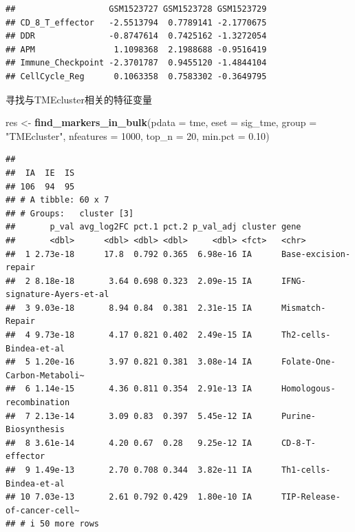 \documentclass[
  12pt,
]{book}
\newenvironment{Shaded}{\begin{snugshade}}{\end{snugshade}}
\newcommand{\AttributeTok}[1]{\textcolor[rgb]{0.13,0.29,0.53}{#1}}
\newcommand{\DecValTok}[1]{\textcolor[rgb]{0.00,0.00,0.81}{#1}}
\newcommand{\FloatTok}[1]{\textcolor[rgb]{0.00,0.00,0.81}{#1}}
\newcommand{\FunctionTok}[1]{\textcolor[rgb]{0.13,0.29,0.53}{\textbf{#1}}}
\newcommand{\NormalTok}[1]{#1}
\newcommand{\OtherTok}[1]{\textcolor[rgb]{0.56,0.35,0.01}{#1}}
\newcommand{\StringTok}[1]{\textcolor[rgb]{0.31,0.60,0.02}{#1}}
\theoremstyle{definition}
\theoremstyle{definition}
\theoremstyle{definition}
\theoremstyle{definition}
\theoremstyle{remark}
\begin{document}
\begin{verbatim}
##                   GSM1523727 GSM1523728 GSM1523729
## CD_8_T_effector   -2.5513794  0.7789141 -2.1770675
## DDR               -0.8747614  0.7425162 -1.3272054
## APM                1.1098368  2.1988688 -0.9516419
## Immune_Checkpoint -2.3701787  0.9455120 -1.4844104
## CellCycle_Reg      0.1063358  0.7583302 -0.3649795
\end{verbatim}

寻找与TMEcluster相关的特征变量

\begin{Shaded}
\begin{Highlighting}[]
\NormalTok{res }\OtherTok{\textless{}{-}} \FunctionTok{find\_markers\_in\_bulk}\NormalTok{(}\AttributeTok{pdata =}\NormalTok{ tme, }\AttributeTok{eset =}\NormalTok{ sig\_tme, }\AttributeTok{group =} \StringTok{"TMEcluster"}\NormalTok{, }\AttributeTok{nfeatures =} \DecValTok{1000}\NormalTok{, }\AttributeTok{top\_n =} \DecValTok{20}\NormalTok{, }\AttributeTok{min.pct =} \FloatTok{0.10}\NormalTok{)}
\end{Highlighting}
\end{Shaded}

\begin{verbatim}
## 
##  IA  IE  IS 
## 106  94  95 
## # A tibble: 60 x 7
## # Groups:   cluster [3]
##       p_val avg_log2FC pct.1 pct.2 p_val_adj cluster gene                       
##       <dbl>      <dbl> <dbl> <dbl>     <dbl> <fct>   <chr>                      
##  1 2.73e-18      17.8  0.792 0.365  6.98e-16 IA      Base-excision-repair       
##  2 8.18e-18       3.64 0.698 0.323  2.09e-15 IA      IFNG-signature-Ayers-et-al 
##  3 9.03e-18       8.94 0.84  0.381  2.31e-15 IA      Mismatch-Repair            
##  4 9.73e-18       4.17 0.821 0.402  2.49e-15 IA      Th2-cells-Bindea-et-al     
##  5 1.20e-16       3.97 0.821 0.381  3.08e-14 IA      Folate-One-Carbon-Metaboli~
##  6 1.14e-15       4.36 0.811 0.354  2.91e-13 IA      Homologous-recombination   
##  7 2.13e-14       3.09 0.83  0.397  5.45e-12 IA      Purine-Biosynthesis        
##  8 3.61e-14       4.20 0.67  0.28   9.25e-12 IA      CD-8-T-effector            
##  9 1.49e-13       2.70 0.708 0.344  3.82e-11 IA      Th1-cells-Bindea-et-al     
## 10 7.03e-13       2.61 0.792 0.429  1.80e-10 IA      TIP-Release-of-cancer-cell~
## # i 50 more rows
\end{verbatim}
\end{document}
